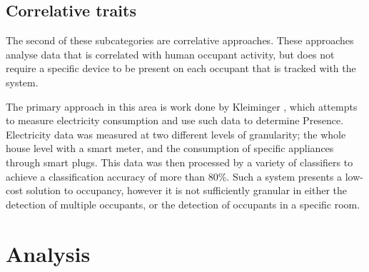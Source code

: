 \documentclass[../thesis/thesis.tex]{subfiles}
\begin{document}
\subsection{Correlative traits}
\label{subsubsec:litreview:sensors:extrinsic:correlative}
The second of these subcategories are correlative approaches. These approaches analyse data that is correlated with human occupant activity, but does not require a specific device to be present on each occupant that is tracked with the system.

The primary approach in this area is work done by Kleiminger \etal \cite{kleiminger2013occupancy}, which attempts to measure electricity consumption and use such data to determine Presence. Electricity data was measured at two different levels of granularity; the whole house level with a smart meter, and the consumption of specific appliances through smart plugs. This data was then processed by a variety of classifiers to achieve a classification accuracy of more than 80\%. Such a system presents a low-cost solution to occupancy, however it is not sufficiently granular in either the detection of multiple occupants, or the detection of occupants in a specific room.

\section{Analysis}
\label{sec:litreview:sensors:analysis}
\end{document}
